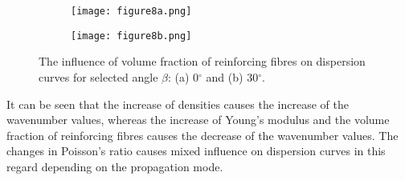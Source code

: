 \documentclass[preprint,12pt]{elsarticle}
\providecommand{\DIFaddbeginFL}{} %
\providecommand{\DIFaddendFL}{} %
\providecommand{\DIFdelbeginFL}{} %
\providecommand{\DIFdelendFL}{} %
\begin{document}
\begin{figure} [h!]
	\centering
	\begin{subfigure}[b]{0.49\textwidth}
		\centering
		\DIFdelbeginFL %
\DIFdelendFL \DIFaddbeginFL \texttt{[image: figure8a.png]}
		\DIFaddendFL \caption{}
		\label{fig:vol0}
	\end{subfigure}
	\hfill
	\begin{subfigure}[b]{0.49\textwidth}
		\centering
		\DIFdelbeginFL %
\DIFdelendFL \DIFaddbeginFL \texttt{[image: figure8b.png]}
		\DIFaddendFL \caption{}
		\label{fig:vol30}
	\end{subfigure}
	\caption{The influence of volume fraction of reinforcing fibres on dispersion curves for selected angle $\beta$: (a) 0$^{\circ}$ and (b) 30$^{\circ}$.} 
	\label{fig:vol}
\end{figure}

It can be seen that the increase of densities causes the increase of the wavenumber values, whereas the increase of  Young's modulus and the volume fraction of reinforcing fibres causes the decrease of the wavenumber values. The changes in Poisson's ratio causes mixed influence on dispersion curves in this regard depending on the propagation mode.
\end{document}
